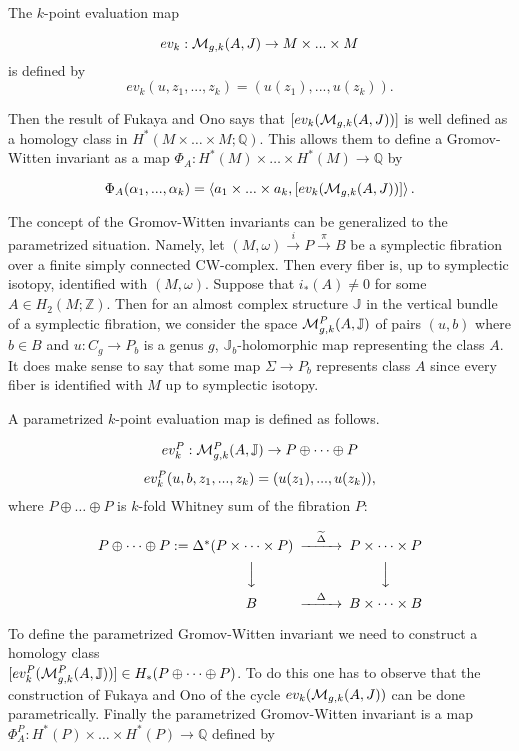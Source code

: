 \documentclass[a4paper,14pt]{article}
\newcommand{\B}[1]{\mathbb #1}
\newcommand{\C}[1]{{\cal #1}}
\newcommand{\al}{{\alpha}}
\newcommand{\De}{{\Delta}}
\newcommand{\Si}{{\Sigma}}
\newcommand{\map}[1]{\stackrel {#1}\longrightarrow}
\newcommand{\Mo}{(M,\omega )}
\newcommand{\sfib}{\Mo \map{i} P\map{\pi } B}
\newcommand{\moplus}{\oplus \dots \oplus}
\newcommand{\BS}{{\bigskip}}
\newcommand{\NI}{{\noindent}}
\numberwithin{equation}{section}
\begin{document}
The $k$-point evaluation map 

$$ev_k:\C M_{g,k}(A,J)\to M\times ... \times M$$ 
is defined by
$$ev_k(u,z_1,...,z_k)= (u(z_1),...,u(z_k)).$$

\NI
Then the result of Fukaya and Ono says that
$[ev_k(\C M_{g,k}(A,J))]$ is well defined as a homology class
in $H^*(M\times \dots \times M;\B Q)$. This allows them to
define a Gromov-Witten
invariant as a map 
$\Phi _A :H^*(M)\times \dots \times H^*(M) \to \B Q$ by

$$\Phi _A (\al_1,...,\al_k) = 
\left <a_1\times ...\times a_k, [ev_k(\C M_{g,k}(A,J))]\right >.$$


The concept of the Gromov-Witten invariants
can be generalized to the parametrized situation.
Namely, let $\sfib $ be a symplectic fibration over
a finite simply connected CW-complex. 
Then every fiber is, up to 
symplectic isotopy, identified with  $\Mo $. 
Suppose that $i_*(A)\neq 0$
for some $A\in H_2(M;\B Z)$. Then
for an almost complex structure $\B J$ in
the vertical bundle of a symplectic fibration,
we consider the space $\C M^P_{g,k}(A,\B J)$ 
of pairs $(u,b)$ where
$b\in B$ and $u:C_g\to P_b$ 
is a genus $g$, $\B J_b$-holomorphic
map representing the class $A$. It does make sense to say that
some map $\Si \to P_b$ represents class $A$ since every
fiber is identified with $M$ up to symplectic isotopy.

A parametrized $k$-point evaluation map is  defined
as follows.

$$
\CD
ev^P_k:\C M^P_{g,k}(A,\B J)\to P\oplus \dots \oplus P\\
ev^P_k(u,b,z_1,...,z_k)=(u(z_1),...,u(z_k)),
\endCD
$$
where $P\oplus \dots \oplus P$ is $k$-fold Whitney sum of the
fibration $P$:


$$
\CD
P\oplus \dots \oplus P:=\De ^*(P\times \dots \times P)
@>\widetilde {\De }>> P\times \dots \times P\\
\qquad\qquad\qquad\qquad @VVV @VVV\\
\qquad\qquad\qquad\qquad B @>\De >> B\times \dots \times B
\endCD
$$

\BS
\NI
To define the parametrized Gromov-Witten invariant
we need to construct a homology class \\
$[ev^P_k(\C M_{g,k}^P(A,\B J))]\in H_*(P\moplus P)$. To do this one has
to observe that the construction of Fukaya and Ono
of the cycle $ev_k(\C M_{g,k}(A,J))$ can be done parametrically.
Finally the parametrized Gromov-Witten invariant
is a map
$\Phi^P_A :H^*(P)\times \dots \times H^*(P) \to \B Q$ defined by
\end{document}
